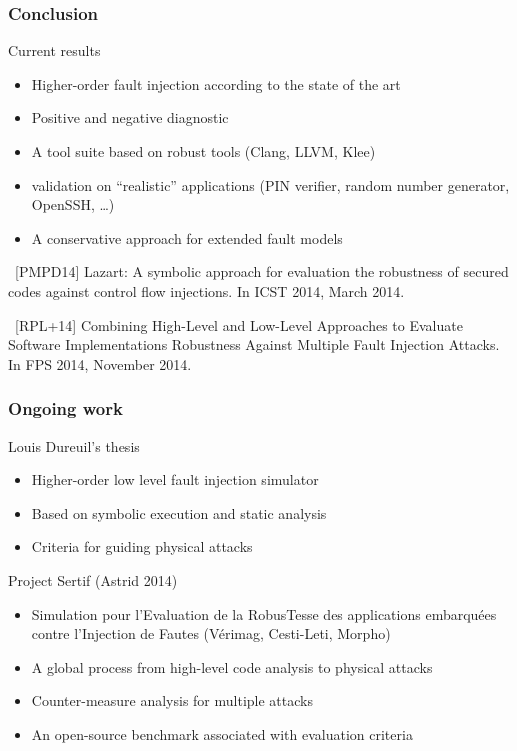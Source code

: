 
\begin{frame} \frametitle{Conclusion}
    \vspace{-.5em}
\begin{block}{Current results}
\begin{itemize}
    \item Higher-order fault injection according to the state of the art 
    \item Positive and negative diagnostic
    \item  A  tool suite based on robust tools (Clang, LLVM, Klee)
\item validation on ``realistic'' applications 
   (PIN verifier, random number generator, OpenSSH, \dots)
\item A  conservative approach for extended fault models
\end{itemize}
\end{block}
    \vspace{.5em}
\vfill

    {\scriptsize ~[PMPD14] Lazart: A symbolic approach for evaluation the robustness of secured codes against control flow injections. In ICST 2014, March 2014.}

    {\scriptsize ~[RPL+14]  Combining High-Level and Low-Level Approaches to Evaluate Software Implementations Robustness Against Multiple Fault Injection Attacks. In FPS 2014, November 2014.}

\end{frame}

\begin{frame} \frametitle{Ongoing work}
\begin{block}{Louis Dureuil's thesis}
\begin{itemize}
\item Higher-order low level fault injection simulator
\item Based on  symbolic execution and static analysis
\item Criteria for guiding physical attacks
\end{itemize}
\end{block}

\vfill
\begin{block}{Project Sertif (Astrid 2014)}
        	\begin{itemize}
\item Simulation pour l'Evaluation de la RobusTesse des applications
embarqu\'ees contre l'Injection de Fautes (V\'erimag, Cesti-Leti, Morpho)

                \item A global process from high-level code analysis to physical attacks
				\item Counter-measure analysis for multiple attacks
                	\item An open-source  benchmark associated with 
evaluation criteria
                	
        	\end{itemize}
\end{block}
\vfill

\end{frame}

